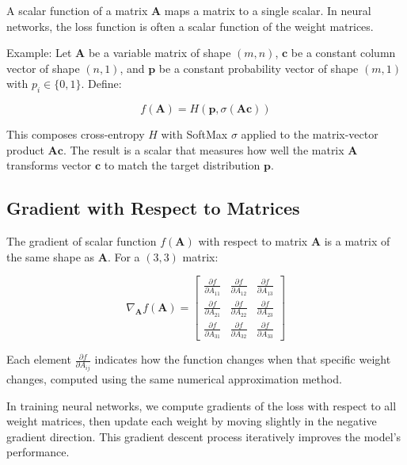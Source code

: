 \documentclass{book}
\begin{document}
A scalar function of a matrix $\mathbf{A}$ maps a matrix to a single scalar. In neural networks, the loss function is often a scalar function of the weight matrices.

Example: Let $\mathbf{A}$ be a variable matrix of shape $(m, n)$, $\mathbf{c}$ be a constant column vector of shape $(n, 1)$, and $\mathbf{p}$ be a constant probability vector of shape $(m, 1)$ with $p_i \in \{0, 1\}$. Define:

\begin{equation}
f(\mathbf{A}) = H(\mathbf{p}, \sigma(\mathbf{Ac}))
\end{equation}

This composes cross-entropy $H$ with SoftMax $\sigma$ applied to the matrix-vector product $\mathbf{Ac}$. The result is a scalar that measures how well the matrix $\mathbf{A}$ transforms vector $\mathbf{c}$ to match the target distribution $\mathbf{p}$.

\subsection{Gradient with Respect to Matrices}

The gradient of scalar function $f(\mathbf{A})$ with respect to matrix $\mathbf{A}$ is a matrix of the same shape as $\mathbf{A}$. For a $(3, 3)$ matrix:

\begin{equation}
\nabla_{\mathbf{A}} f(\mathbf{A}) = \begin{bmatrix}
\frac{\partial f}{\partial A_{11}} & \frac{\partial f}{\partial A_{12}} & \frac{\partial f}{\partial A_{13}} \\
\frac{\partial f}{\partial A_{21}} & \frac{\partial f}{\partial A_{22}} & \frac{\partial f}{\partial A_{23}} \\
\frac{\partial f}{\partial A_{31}} & \frac{\partial f}{\partial A_{32}} & \frac{\partial f}{\partial A_{33}}
\end{bmatrix}
\end{equation}

Each element $\frac{\partial f}{\partial A_{ij}}$ indicates how the function changes when that specific weight changes, computed using the same numerical approximation method.

In training neural networks, we compute gradients of the loss with respect to all weight matrices, then update each weight by moving slightly in the negative gradient direction. This gradient descent process iteratively improves the model's performance.
\end{document}
